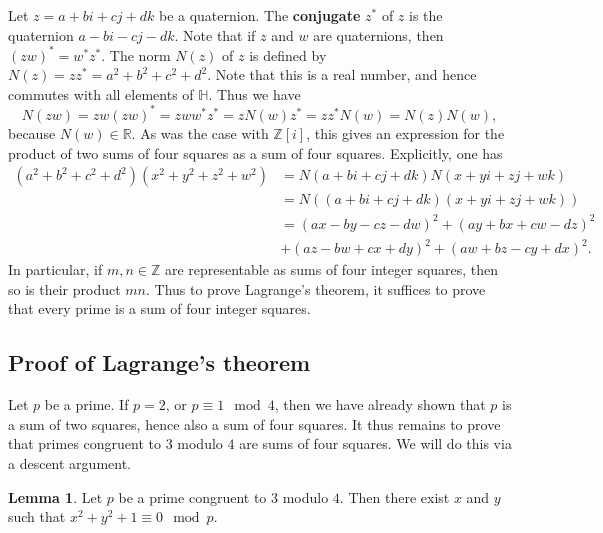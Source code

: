 \documentclass{article}
\newcommand{\Z}{\mathbb{Z}}
\newcommand{\R}{\mathbb{R}}
\renewcommand{\H}{\mathbb{H}}
\newcommand{\rb}[1]{\left( #1 \right)}
\renewcommand{\sb}[1]{\left[ #1 \right]}
\theoremstyle{definition}\newtheorem{definition}{Definition}
\theoremstyle{definition}\newtheorem{remark}[definition]{Remark}
\theoremstyle{definition}\newtheorem*{example}{Example}
\theoremstyle{definition}\newtheorem*{note}{Note}
\newtheorem{lemma}[definition]{Lemma}
\begin{document}
Let $ z = a + bi + cj + dk $ be a quaternion. The \textbf{conjugate} $ z^* $ of $ z $ is the quaternion $ a - bi - cj - dk $. Note that if $ z $ and $ w $ are quaternions, then $ \rb{zw}^* = w^*z^* $. The norm $ N\rb{z} $ of $ z $ is defined by $ N\rb{z} = zz^* = a^2 + b^2 + c^2 + d^2 $. Note that this is a real number, and hence commutes with all elements of $ \H $. Thus we have
$$ N\rb{zw} = zw\rb{zw}^* = zww^*z^* =  zN\rb{w}z^* = zz^*N\rb{w} = N\rb{z}N\rb{w}, $$
because $ N\rb{w} \in \R $. As was the case with $ \Z\sb{i} $, this gives an expression for the product of two sums of four squares as a sum of four squares. Explicitly, one has
\begin{align*}
\rb{a^2 + b^2 + c^2 + d^2}\rb{x^2 + y^2 + z^2 + w^2}
& = N\rb{a + bi + cj + dk}N\rb{x + yi + zj + wk} \\
& = N\rb{\rb{a + bi + cj + dk}\rb{x + yi + zj + wk}} \\
& = \rb{ax - by - cz - dw}^2 + \rb{ay + bx + cw - dz}^2 \\
& + \rb{az - bw + cx + dy}^2 + \rb{aw + bz - cy + dx}^2.
\end{align*}
In particular, if $ m, n \in \Z $ are representable as sums of four integer squares, then so is their product $ mn $. Thus to prove Lagrange's theorem, it suffices to prove that every prime is a sum of four integer squares.

\subsection{Proof of Lagrange's theorem}

Let $ p $ be a prime. If $ p = 2 $, or $ p \equiv 1 \mod 4 $, then we have already shown that $ p $ is a sum of two squares, hence also a sum of four squares. It thus remains to prove that primes congruent to $ 3 $ modulo $ 4 $ are sums of four squares. We will do this via a descent argument.


\begin{lemma}
\label{lem:54}
Let $ p $ be a prime congruent to $ 3 $ modulo $ 4 $. Then there exist $ x $ and $ y $ such that $ x^2 + y^2 + 1 \equiv 0 \mod p $.
\end{lemma}
\end{document}
